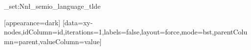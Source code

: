 \begingroup
\ExplSyntaxOn\tl_set:Nn\l_semio_language_tl{de}\ExplSyntaxOff
\begin{VizFigure}[width=80,height=40,title={}]
[appearance=dark]
[data={xy-nodes},idColumn={id},iterations={1},labels={false},layout={force},mode={bst},parentColumn={parent},valueColumn={value}]
\end{VizFigure}
\endgroup
